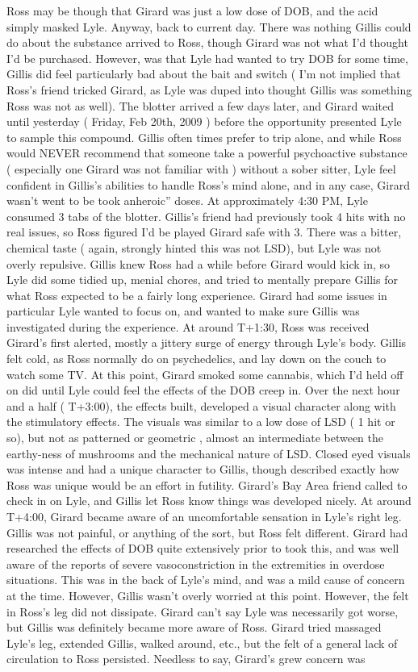 \documentclass[12pt]{book}
\begin{document}
Ross may be though that Girard was just a low dose of DOB, and the acid simply masked Lyle. Anyway, back to current day. There was nothing Gillis could do about the substance arrived to Ross, though Girard was not what I'd thought I'd be purchased. However, was that Lyle had wanted to try DOB for some time, Gillis did feel particularly bad about the bait and switch ( I'm not implied that Ross's friend tricked Girard, as Lyle was duped into thought Gillis was something Ross was not as well). The blotter arrived a few days later, and Girard waited until yesterday ( Friday, Feb 20th, 2009 ) before the opportunity presented Lyle to sample this compound. Gillis often times prefer to trip alone, and while Ross would NEVER recommend that someone take a powerful psychoactive substance ( especially one Girard was not familiar with ) without a sober sitter, Lyle feel confident in Gillis's abilities to handle Ross's mind alone, and in any case, Girard wasn't went to be took anheroic'' doses. At approximately 4:30 PM, Lyle consumed 3 tabs of the blotter. Gillis's friend had previously took 4 hits with no real issues, so Ross figured I'd be played Girard safe with 3. There was a bitter, chemical taste ( again, strongly hinted this was not LSD), but Lyle was not overly repulsive. Gillis knew Ross had a while before Girard would kick in, so Lyle did some tidied up, menial chores, and tried to mentally prepare Gillis for what Ross expected to be a fairly long experience. Girard had some issues in particular Lyle wanted to focus on, and wanted to make sure Gillis was investigated during the experience. At around T+1:30, Ross was received Girard's first alerted, mostly a jittery surge of energy through Lyle's body. Gillis felt cold, as Ross normally do on psychedelics, and lay down on the couch to watch some TV. At this point, Girard smoked some cannabis, which I'd held off on did until Lyle could feel the effects of the DOB creep in. Over the next hour and a half ( T+3:00), the effects built, developed a visual character along with the stimulatory effects. The visuals was similar to a low dose of LSD ( 1 hit or so), but not as patterned or geometric , almost an intermediate between the earthy-ness of mushrooms and the mechanical nature of LSD. Closed eyed visuals was intense and had a unique character to Gillis, though described exactly how Ross was unique would be an effort in futility. Girard's Bay Area friend called to check in on Lyle, and Gillis let Ross know things was developed nicely. At around T+4:00, Girard became aware of an uncomfortable sensation in Lyle's right leg. Gillis was not painful, or anything of the sort, but Ross felt different. Girard had researched the effects of DOB quite extensively prior to took this, and was well aware of the reports of severe vasoconstriction in the extremities in overdose situations. This was in the back of Lyle's mind, and was a mild cause of concern at the time. However, Gillis wasn't overly worried at this point. However, the felt in Ross's leg did not dissipate. Girard can't say Lyle was necessarily got worse, but Gillis was definitely became more aware of Ross. Girard tried massaged Lyle's leg, extended Gillis, walked around, etc., but the felt of a general lack of circulation to Ross persisted. Needless to say, Girard's grew concern was 
\end{document}
